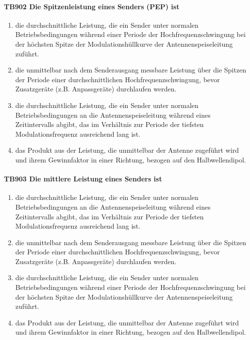 \documentclass[8pt]{article}
\begin{document}
\begin{enumerate}
\paragraph*{TB902 Die Spitzenleistung eines Senders (PEP) ist}
\begin{enumerate}[nolistsep,label=\Alph*]
\item die durchschnittliche Leistung, die ein Sender unter normalen Betriebsbedingungen während
einer Periode der Hochfrequenzschwingung bei der höchsten Spitze der Modulationshüllkurve der Antennenspeiseleitung zuführt.
\item die unmittelbar nach dem Senderausgang messbare Leistung über die Spitzen der Periode einer durchschnittlichen Hochfrequenzschwingung, bevor Zusatzgeräte (z.B. Anpassgeräte) durchlaufen werden.
\item die durchschnittliche Leistung, die ein Sender unter normalen Betriebsbedingungen an die Antennenspeiseleitung während eines Zeitintervalls abgibt, das im Verhältnis zur Periode der tiefsten Modulationsfrequenz ausreichend lang ist.
\item das Produkt aus der Leistung, die unmittelbar der Antenne zugeführt wird und ihrem Gewinnfaktor in einer Richtung, bezogen auf den Halbwellendipol.
\end{enumerate}

\paragraph*{TB903 Die mittlere Leistung eines Senders ist}
\begin{enumerate}[nolistsep,label=\Alph*]
\item die durchschnittliche Leistung, die ein Sender unter normalen Betriebsbedingungen an die Antennenspeiseleitung während eines Zeitintervalls abgibt, das im Verhältnis zur Periode der tiefsten Modulationsfrequenz ausreichend lang ist.
\item die unmittelbar nach dem Senderausgang messbare Leistung über die Spitzen der Periode einer durchschnittlichen Hochfrequenzschwingung, bevor Zusatzgeräte (z.B. Anpassgeräte) durchlaufen werden.
\item die durchschnittliche Leistung, die ein Sender unter normalen Betriebsbedingungen während einer Periode der Hochfrequenzschwingung bei der höchsten Spitze der Modulationshüllkurve der Antennenspeiseleitung zuführt.
\item das Produkt aus der Leistung, die unmittelbar der Antenne zugeführt wird und ihrem Gewinnfaktor in einer Richtung, bezogen auf den Halbwellendipol.
\end{enumerate}


\end{enumerate}
\end{document}
